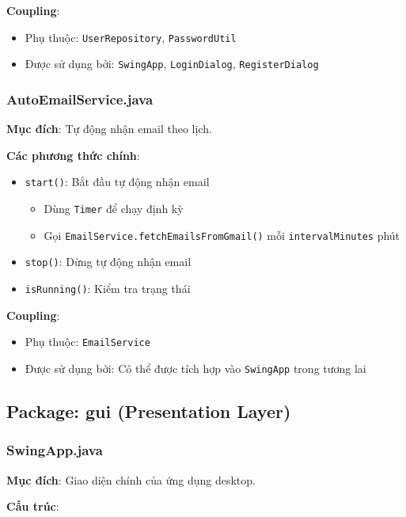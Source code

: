 \documentclass[12pt,a4paper]{article}
\begin{document}
\textbf{Coupling}:
\begin{itemize}
    \item Phụ thuộc: \texttt{UserRepository}, \texttt{PasswordUtil}
    \item Được sử dụng bởi: \texttt{SwingApp}, \texttt{LoginDialog}, \texttt{RegisterDialog}
\end{itemize}

\subsubsection{AutoEmailService.java}
\textbf{Mục đích}: Tự động nhận email theo lịch.

\textbf{Các phương thức chính}:
\begin{itemize}
    \item \texttt{start()}: Bắt đầu tự động nhận email
    \begin{itemize}
        \item Dùng \texttt{Timer} để chạy định kỳ
        \item Gọi \texttt{EmailService.fetchEmailsFromGmail()} mỗi \texttt{intervalMinutes} phút
    \end{itemize}
    \item \texttt{stop()}: Dừng tự động nhận email
    \item \texttt{isRunning()}: Kiểm tra trạng thái
\end{itemize}

\textbf{Coupling}:
\begin{itemize}
    \item Phụ thuộc: \texttt{EmailService}
    \item Được sử dụng bởi: Có thể được tích hợp vào \texttt{SwingApp} trong tương lai
\end{itemize}

\subsection{Package: gui (Presentation Layer)}

\subsubsection{SwingApp.java}
\textbf{Mục đích}: Giao diện chính của ứng dụng desktop.

\textbf{Cấu trúc}:
\end{document}

